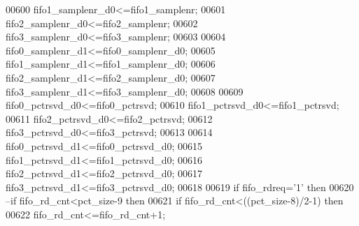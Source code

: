 \begin{DoxyCode}
00600             \textcolor{vhdlchar}{fifo1_samplenr_d0}\textcolor{vhdlchar}{<=}\textcolor{vhdlchar}{fifo1_samplenr};
00601             \textcolor{vhdlchar}{fifo2_samplenr_d0}\textcolor{vhdlchar}{<=}\textcolor{vhdlchar}{fifo2_samplenr};
00602             \textcolor{vhdlchar}{fifo3_samplenr_d0}\textcolor{vhdlchar}{<=}\textcolor{vhdlchar}{fifo3_samplenr};
00603             
00604             \textcolor{vhdlchar}{fifo0_samplenr_d1}\textcolor{vhdlchar}{<=}\textcolor{vhdlchar}{fifo0_samplenr_d0};
00605             \textcolor{vhdlchar}{fifo1_samplenr_d1}\textcolor{vhdlchar}{<=}\textcolor{vhdlchar}{fifo1_samplenr_d0};
00606             \textcolor{vhdlchar}{fifo2_samplenr_d1}\textcolor{vhdlchar}{<=}\textcolor{vhdlchar}{fifo2_samplenr_d0};
00607             \textcolor{vhdlchar}{fifo3_samplenr_d1}\textcolor{vhdlchar}{<=}\textcolor{vhdlchar}{fifo3_samplenr_d0};
00608             
00609             \textcolor{vhdlchar}{fifo0_pctrsvd_d0}\textcolor{vhdlchar}{<=}\textcolor{vhdlchar}{fifo0_pctrsvd};
00610             \textcolor{vhdlchar}{fifo1_pctrsvd_d0}\textcolor{vhdlchar}{<=}\textcolor{vhdlchar}{fifo1_pctrsvd};
00611             \textcolor{vhdlchar}{fifo2_pctrsvd_d0}\textcolor{vhdlchar}{<=}\textcolor{vhdlchar}{fifo2_pctrsvd};
00612             \textcolor{vhdlchar}{fifo3_pctrsvd_d0}\textcolor{vhdlchar}{<=}\textcolor{vhdlchar}{fifo3_pctrsvd};
00613             
00614             \textcolor{vhdlchar}{fifo0_pctrsvd_d1}\textcolor{vhdlchar}{<=}\textcolor{vhdlchar}{fifo0_pctrsvd_d0};
00615             \textcolor{vhdlchar}{fifo1_pctrsvd_d1}\textcolor{vhdlchar}{<=}\textcolor{vhdlchar}{fifo1_pctrsvd_d0};
00616             \textcolor{vhdlchar}{fifo2_pctrsvd_d1}\textcolor{vhdlchar}{<=}\textcolor{vhdlchar}{fifo2_pctrsvd_d0};
00617             \textcolor{vhdlchar}{fifo3_pctrsvd_d1}\textcolor{vhdlchar}{<=}\textcolor{vhdlchar}{fifo3_pctrsvd_d0};
00618             
00619           \textcolor{keywordflow}{if} \textcolor{vhdlchar}{fifo_rdreq}\textcolor{vhdlchar}{=}\textcolor{vhdlchar}{'}\textcolor{vhdllogic}{}\textcolor{vhdllogic}{1}\textcolor{vhdlchar}{'} \textcolor{keywordflow}{then} 
00620 \textcolor{keyword}{              --if fifo\_rd\_cnt<pct\_size-9 then }
00621               \textcolor{keywordflow}{if} \textcolor{vhdlchar}{fifo_rd_cnt}\textcolor{vhdlchar}{<}\textcolor{vhdlchar}{(}\textcolor{vhdlchar}{(}\textcolor{vhdlchar}{pct_size}\textcolor{vhdlchar}{-}\textcolor{vhdllogic}{}\textcolor{vhdllogic}{8}\textcolor{vhdlchar}{)}\textcolor{vhdlchar}{/}\textcolor{vhdllogic}{2-1}\textcolor{vhdlchar}{)} \textcolor{keywordflow}{then} 
00622                   \textcolor{vhdlchar}{fifo_rd_cnt}\textcolor{vhdlchar}{<=}\textcolor{vhdlchar}{fifo_rd_cnt}\textcolor{vhdlchar}{+}\textcolor{vhdllogic}{}\textcolor{vhdllogic}{1};

\end{DoxyCode}
